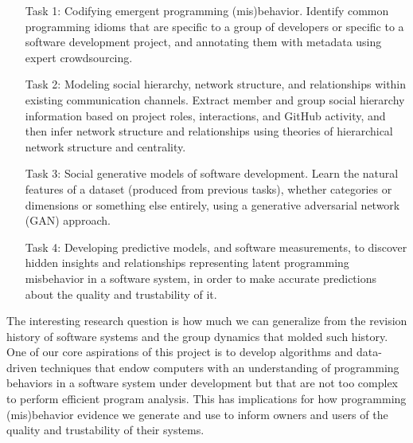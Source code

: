 \begin{itemize}
  \addtolength{\itemindent}{3.9mm}
  \item[Task 1:] Codifying emergent programming (mis)behavior. Identify common
  programming idioms that are specific to a group of developers or specific to a
  software development project, and annotating them with metadata using expert
  crowdsourcing.
  \item[Task 2:] Modeling social hierarchy, network structure, and relationships
  within existing communication channels. Extract member and group social
  hierarchy information based on project roles, interactions, and GitHub
  activity, and then infer network structure and relationships using theories of
  hierarchical network structure and centrality.
  \item[Task 3:] Social generative models of software development. Learn the
  natural features of a dataset (produced from previous tasks), whether
  categories or dimensions or something else entirely, using a generative
  adversarial network (GAN) approach.
  \item[Task 4:] Developing predictive models, and software measurements, to
  discover hidden insights and relationships representing latent programming
  misbehavior in a software system, in order to make accurate predictions
  about the quality and trustability of it.
\end{itemize}

The interesting research question is how much we can generalize from the
revision history of software systems and the group dynamics that molded such
history. One of our core aspirations of this project is to develop algorithms
and data-driven techniques that endow computers with an understanding of
programming behaviors in a software system under development but that are not
too complex to perform efficient program analysis. This has implications for how
programming (mis)behavior evidence we generate and use to inform owners and
users of the quality and trustability of their systems.

